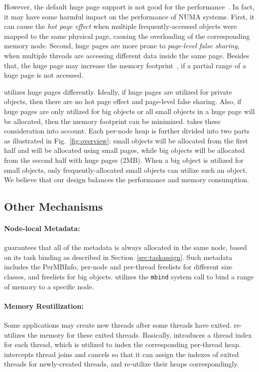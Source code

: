 However, the default huge page support is not good for the performance~\cite{Gaud:2014:LPM:2643634.2643659, DBLP:conf/asplos/PanwarBG19}. In fact, it may have some harmful impact on the performance of NUMA systems. First, it can cause the \textit{hot page effect} when multiple frequently-accessed objects  were  mapped  to  the  same  physical  page, causing the overloading of the corresponding memory node. Second, huge pages are more prone to \textit{page-level false sharing}, when multiple threads are accessing different data inside the same page. Besides that, the huge page may increase the memory footprint~\cite{DBLP:conf/asplos/MaasAIJMR20}, if a partial range of a huge page is not accessed. 

\NA{} utilizes huge pages differently. Ideally, if huge pages are utilized for private objects, then there are no hot page effect and page-level false sharing. Also, if huge pages are only utilized for big objects or all small objects in a huge page will be allocated, then the memory footprint can be minimized. \NA{} takes these consideration into account. Each per-node heap is further divided into two parts as illustrated in Fig.~\ref{fig:overview}: small objects will be allocated from the first half and will be allocated using small pages, while big objects will be allocated from the second half with huge pages (2MB). When a big object is utilized for small objects, only frequently-allocated small objects can utilize such an object. We believe that our design balances the performance and memory consumption.   

\subsection{Other Mechanisms}

\paragraph{Node-local Metadata:} \NM{} guarantees that all of the metadata is always allocated in the same node, based on its task binding as described in Section~\ref{sec:taskassign}. Such metadata includes the PerMBInfo, per-node and per-thread freelists for different size classes, and freelists for big objects. \NM{} utilizes the \texttt{mbind} system call to bind a range of memory to a specific node.  

\paragraph{Memory Reutilization:} Some applications may create new threads after some threads have exited. \NM{} re-utilizes the memory for these exited threads. Basically, \NM{} introduces a thread index for each thread, which is utilized to index the corresponding per-thread heap.  \NM{} intercepts thread joins and cancels so that it can assign the indexes of exited threads for newly-created threads, and re-utilize their heaps correspondingly.  


